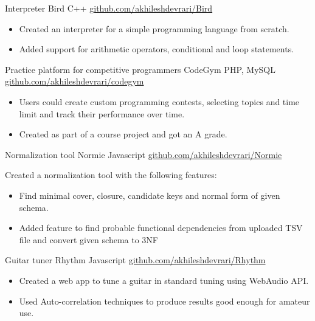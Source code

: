 \documentclass[]{awesome-cv}
\begin{document}
\begin{cventries}
	\cventry
	{Interpreter}
	{Bird}
	{C++}
	{\href{https://github.com/akhileshdevrari/Bird}{github.com/akhileshdevrari/Bird}}
	{
		\vspace{-3mm}
		\begin{itemize}
			\item Created an interpreter for a simple programming language from scratch.
			\item Added support for arithmetic operators, conditional and loop statements.
		\end{itemize}		
	}
	
	\vspace{-5mm}
	\cventry
	{Practice platform for competitive programmers}
	{CodeGym}
	{PHP, MySQL}
	{\href{https://github.com/akhileshdevrari/codegym}{github.com/akhileshdevrari/codegym}}
	{
		\vspace{-3mm}
		\begin{itemize}
			\item Users could create custom programming contests, selecting topics and time limit and track their performance over time.
			\item Created as part of a course project and got an A grade.
		\end{itemize}
	}
	
	
	\vspace{-5mm}
	\cventry
	{Normalization tool}
	{Normie}
	{Javascript}
	{\href{https://github.com/akhileshdevrari/Normie}{github.com/akhileshdevrari/Normie}}
	{
		Created a normalization tool with the following features:
		\begin{itemize}
			\item Find minimal cover, closure, candidate keys and normal form of given schema.
			\item Added feature to find probable functional dependencies from uploaded TSV file and convert given schema to 3NF
		\end{itemize}
	}
	
	\vspace{-5mm}
	\cventry
	{Guitar tuner}
	{Rhythm}
	{Javascript}
	{\href{https://github.com/akhileshdevrari/Rhythm}{github.com/akhileshdevrari/Rhythm}}
	{
		\vspace{-3mm}
		\begin{itemize}
		\item Created a web app to tune a guitar in standard tuning using WebAudio API.
		\item Used Auto-correlation techniques to produce results good enough for amateur use.
		\end{itemize}	
	}
	

\end{cventries}
\end{document}
